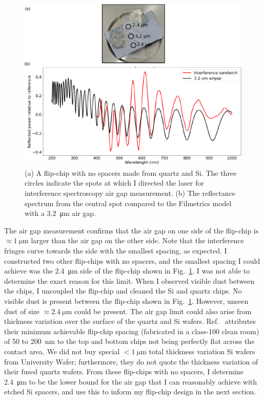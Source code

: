 \documentclass[double,12pt,1in,seploa]{beavtex}
\begin{document}
\begin{figure}
    \includegraphics[width=1\textwidth]{interference sandwich image and spectrum.pdf}
    \caption{(a) A flip-chip with no spacers made from quartz and Si. The three circles indicate the spots at which I directed the laser for interference spectroscopy air gap measurement. (b) The reflectance spectrum from the central spot compared to the Filmetrics model with a \SI{3.2}{\micro\meter} air gap.}
    \label{interference sandwich}
\end{figure}

The air gap measurement confirms that the air gap on one side of the flip-chip is $\approx \SI{1}{\micro\meter}$ larger than the air gap on the other side. Note that the interference fringes curve towards the side with the smallest spacing, as expected. I constructed two other flip-chips with no spacers, and the smallest spacing I could achieve was the \SI{2.4}{\micro\meter} side of the flip-chip shown in Fig.\ \ref{interference sandwich}. I was not able to determine the exact reason for this limit. When I observed visible dust between the chips, I uncoupled the flip-chip and cleaned the Si and quartz chips. No visible dust is present between the flip-chip shown in Fig.\ \ref{interference sandwich}. However, unseen dust of size $\approx \SI{2.4}{\micro\meter}$ could be present. The air gap limit could also arise from thickness variation over the surface of the quartz and Si wafers. Ref.\ \cite{bennaceur_mechanical_2015} attributes their minimum achievable flip-chip spacing (fabricated in a class-100 clean room) of 50 to \SI{200}{\nano\meter} to the top and bottom chips not being perfectly flat across the contact area. We did not buy special $< \SI{1}{\micro\meter}$ total thickness variation Si wafers from University Wafer; furthermore, they do not quote the thickness variation of their fused quartz wafers. From these flip-chips with no spacers, I determine \SI{2.4}{\micro\meter} to be the lower bound for the air gap that I can reasonably achieve with etched Si spacers, and use this to inform my flip-chip design in the next section.
\end{document}
